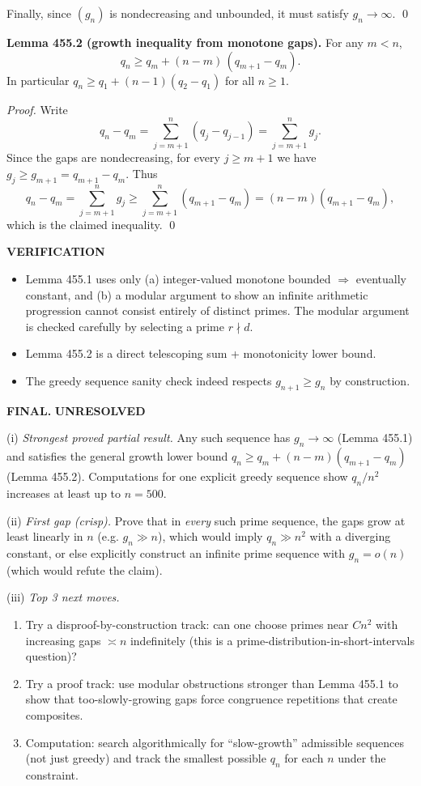 Finally, since $(g_n)$ is nondecreasing and unbounded, it must satisfy $g_n\to\infty$.
\qed

\medskip

\textbf{Lemma 455.2 (growth inequality from monotone gaps).}
For any $m<n$,
\[
q_n\ge q_m+(n-m)\,(q_{m+1}-q_m).
\]
In particular $q_n\ge q_1+(n-1)(q_2-q_1)$ for all $n\ge 1$.

\emph{Proof.}
Write
\[
q_n-q_m=\sum_{j=m+1}^n (q_j-q_{j-1})=\sum_{j=m+1}^n g_j.
\]
Since the gaps are nondecreasing, for every $j\ge m+1$ we have $g_j\ge g_{m+1}=q_{m+1}-q_m$. Thus
\[
q_n-q_m=\sum_{j=m+1}^n g_j\ge \sum_{j=m+1}^n (q_{m+1}-q_m)=(n-m)(q_{m+1}-q_m),
\]
which is the claimed inequality.
\qed

\medskip

\textbf{VERIFICATION}

\begin{itemize}
\item Lemma 455.1 uses only (a) integer-valued monotone bounded $\Rightarrow$ eventually constant, and (b) a modular argument to show an infinite arithmetic progression cannot consist entirely of distinct primes. The modular argument is checked carefully by selecting a prime $r\nmid d$.
\item Lemma 455.2 is a direct telescoping sum + monotonicity lower bound.
\item The greedy sequence sanity check indeed respects $g_{n+1}\ge g_n$ by construction.
\end{itemize}

\textbf{FINAL.} \textbf{UNRESOLVED}

(i) \emph{Strongest proved partial result.} Any such sequence has $g_n\to\infty$ (Lemma 455.1) and satisfies the general growth lower bound $q_n\ge q_m+(n-m)(q_{m+1}-q_m)$ (Lemma 455.2). Computations for one explicit greedy sequence show $q_n/n^2$ increases at least up to $n=500$.

(ii) \emph{First gap (crisp).} Prove that in \emph{every} such prime sequence, the gaps grow at least linearly in $n$ (e.g. $g_n\gg n$), which would imply $q_n\gg n^2$ with a diverging constant, or else explicitly construct an infinite prime sequence with $g_n=o(n)$ (which would refute the claim).

(iii) \emph{Top 3 next moves.}
\begin{enumerate}
\item Try a disproof-by-construction track: can one choose primes near $C n^2$ with increasing gaps $\asymp n$ indefinitely (this is a prime-distribution-in-short-intervals question)?
\item Try a proof track: use modular obstructions stronger than Lemma 455.1 to show that too-slowly-growing gaps force congruence repetitions that create composites.
\item Computation: search algorithmically for ``slow-growth'' admissible sequences (not just greedy) and track the smallest possible $q_n$ for each $n$ under the constraint.
\end{enumerate}

